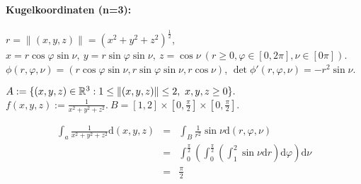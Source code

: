 \documentclass{article}
\begin{document}
\paragraph{Kugelkoordinaten (n=3):} $ $\\
$r=\|(x,y,z)\|=(x^2+y^2+z^2)^{\frac{1}{2}}$,\\
$x=r\cos\varphi\sin\nu,\ y=r\sin\varphi\sin\nu,\ z=\cos\nu\ (r\ge 0, \varphi\in[0,2\pi],\nu\in[0\pi])$.\\
$\phi(r,\varphi,\nu)=(r\cos\varphi\sin\nu,r\sin\varphi\sin\nu,r\cos\nu)$, $\det\phi'(r,\varphi,\nu)=-r^2\sin\nu$.
\begin{beispiel}
$A:=\{(x,y,z)\in\mathbb{R}^3: 1\le\|(x,y,z)\|\le 2,\ x,y,z\ge 0\}.$\\
$f(x,y,z):=\frac{1}{x^2+y^2+z^2}.\ B=[1,2]\times[0,\frac{\pi}{2}]\times[0,\frac{\pi}{2}]$.

\begin{eqnarray*}
\int_a\frac{1}{x^2+y^2+z^2}\text{d}(x,y,z)&=&\int_B\frac{1}{r^2}\sin\nu\text{d}(r,\varphi,\nu)\\
&=&\int_0^\frac{\pi}{2}(\int_0^\frac{\pi}{2}(\int_1^2\sin\nu\text{d}r)\text{d}\varphi)\text{d}\nu\\
&=&\frac{\pi}{2}
\end{eqnarray*}
\end{beispiel}
\end{document}
